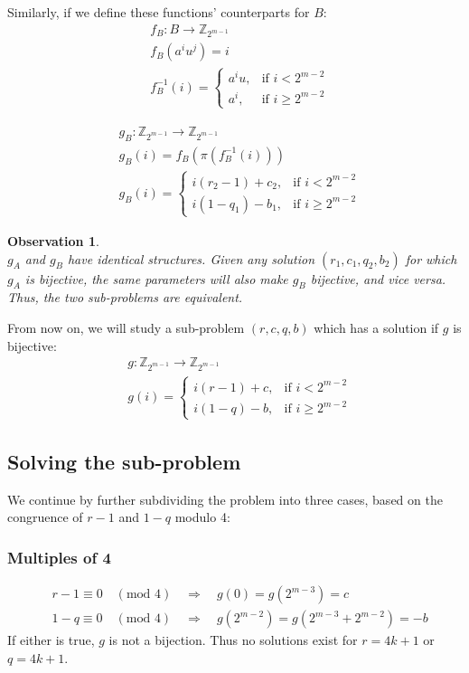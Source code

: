 \documentclass[11pt]{llncs}
\newtheorem{observation}[theorem]{Observation}
\begin{document}
Similarly, if we define these functions' counterparts for $B$:
\[ \begin{aligned}
& f_B: B \to \mathbb{Z}_{2^{m-1}}\\
& f_B(a^iu^j) = i \\
& f_B^{-1}(i) = \begin{cases}
	a^iu, & \text{if } i < 2^{m-2} \\
	a^i, & \text{if } i \geq 2^{m-2}
\end{cases} \end{aligned} \]

\[ \begin{aligned}
& g_B: \mathbb{Z}_{2^{m-1}} \to \mathbb{Z}_{2^{m-1}}\\
& g_B(i) = f_B(\pi(f_B^{-1}(i))) \\
& g_B(i) = \begin{cases}
	i(r_2-1)+c_2, & \text{if } i < 2^{m-2} \\
	i(1-q_1)-b_1, & \text{if }  i \geq 2^{m-2}
\end{cases}
\end{aligned} \]

\begin{observation} \hfill\\
$g_A$ and $g_B$ have identical structures. Given any solution $(r_1, c_1, q_2, b_2)$ for which $g_A$ is bijective, the same parameters will also make $g_B$ bijective, and vice versa. Thus, the two sub-problems are equivalent.
\end{observation}

From now on, we will study a sub-problem $(r,c,q,b)$ which has a solution if $g$ is bijective:
\[ \begin{aligned}
& g: \mathbb{Z}_{2^{m-1}} \to \mathbb{Z}_{2^{m-1}} \\
& g(i) = \begin{cases}
	i(r-1)+c, & \text{if } i < 2^{m-2} \\
	i(1-q)-b, & \text{if }  i \geq 2^{m-2}
\end{cases}
\end{aligned} \]

\subsection{Solving the sub-problem}

We continue by further subdividing the problem into three cases, based on the congruence of $r-1$ and $1-q$ modulo 4:

\subsubsection{Multiples of 4}
\[ \begin{aligned}
& r-1 \equiv 0 \quad (\text{mod }4) \quad\Rightarrow\quad g(0) = g(2^{m-3}) = c \\
& 1-q \equiv 0 \quad (\text{mod }4) \quad\Rightarrow\quad g(2^{m-2}) = g(2^{m-3}+2^{m-2}) = -b
\end{aligned} \]
If either is true, $g$ is not a bijection. Thus no solutions exist for $r = 4k+1$ or $q = 4k+1$.
\end{document}
